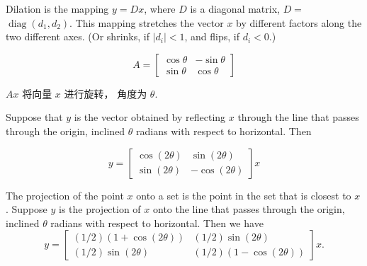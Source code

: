 \begin{definition}[Dilation]
    Dilation is the mapping $ y=D x $, where $ D $ is a diagonal matrix, $ D= $ $ \operatorname{diag}\left(d_{1}, d_{2}\right) $. This mapping stretches the vector $ x $ by different factors along the two different axes. (Or shrinks, if $ \left|d_{i}\right|<1 $, and flips, if $ d_{i}<0 $.)
\end{definition}







\begin{definition}[旋转矩阵]
    \begin{equation} A=\left[\begin{array}{cc}\cos \theta & -\sin \theta \\ \sin \theta & \cos \theta\end{array}\right] \end{equation}

    $ {A} x $ 将向量 $ x $ 进行旋转， 角度为 $ \theta $.
\end{definition}

\begin{definition}
    Suppose that $y$ is the vector obtained by reflecting $x$ through the line
    that passes through the origin, inclined $\theta$ radians with respect to horizontal. Then

    \begin{equation} y=\left[\begin{array}{rr}\cos (2 \theta) & \sin (2 \theta) \\ \sin (2 \theta) & -\cos (2 \theta)\end{array}\right] x \end{equation}
\end{definition}


\begin{definition}
    The projection of the point $ x $ onto a set is the point in the set that is closest to $ x $. Suppose $ y $ is the projection of $ x $ onto the line that passes through the origin, inclined $ \theta $ radians with respect to horizontal. Then we have
\begin{equation}
y=\left[\begin{array}{cc}
(1 / 2)(1+\cos (2 \theta)) & (1 / 2) \sin (2 \theta) \\
(1 / 2) \sin (2 \theta) & (1 / 2)(1-\cos (2 \theta))
\end{array}\right] x .
\end{equation}
\end{definition}

